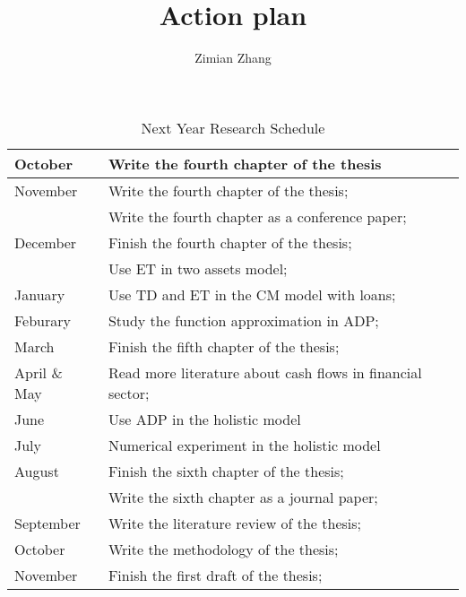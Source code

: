 \documentclass[12pt]{article}
\author{Zimian Zhang}
\title{Action plan}
\begin{document}

\thispagestyle{empty}

\newpage

\thispagestyle{empty}

\newpage


\begin{table}

\centering
\begin{tabular}{| l | l |}
\hline
\hline
October & Write the fourth chapter of the thesis\\
\hline
November & Write the fourth chapter of the thesis;\\

& Write the fourth chapter as a conference paper;\\
\hline
December & Finish the fourth chapter of the thesis;\\
& Use ET in two assets model;\\
\hline
January & Use TD and ET in the CM model with loans;\\
\hline
Feburary & Study the function approximation in ADP;\\
\hline
March & Finish the fifth chapter of the thesis;\\
\hline
April \& May & Read more literature about cash flows in financial sector;\\
\hline
June & Use ADP in the holistic model\\
\hline
July & Numerical experiment in the holistic model\\
\hline
August & Finish the sixth chapter of the thesis;\\
 & Write the sixth chapter as a journal paper;\\
\hline
September & Write the literature review of the thesis;\\

\hline
October & Write the methodology of the thesis;\\
 
\hline
November & Finish the first draft of the thesis;\\


\hline
\hline
\end{tabular}
\caption{Next Year Research Schedule}
\label{Plan}
\end{table}

\end{document}
